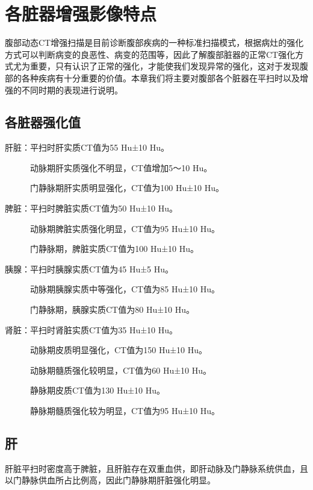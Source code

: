 \chapter{各脏器增强影像特点}

腹部动态CT增强扫描是目前诊断腹部疾病的一种标准扫描模式，根据病灶的强化方式可以判断病变的良恶性、病变的范围等，因此了解腹部脏器的正常CT强化方式尤为重要，只有认识了正常的强化，才能使我们发现异常的强化，这对于发现腹部的各种疾病有十分重要的价值。本章我们将主要对腹部各个脏器在平扫时以及增强的不同时期的表现进行说明。

\section{各脏器强化值}

肝脏：平扫时肝实质CT值为55 Hu±10 Hu。

　　　动脉期肝实质强化不明显，CT值增加5～10 Hu。

　　　门静脉期肝实质明显强化，CT值为100 Hu±10 Hu。

脾脏：平扫时脾脏实质CT值为50 Hu±10 Hu。

　　　动脉期脾脏实质强化明显，CT值为95 Hu±10 Hu。

　　　门静脉期，脾脏实质CT值为100 Hu±10 Hu。

胰腺：平扫时胰腺实质CT值为45 Hu±5 Hu。

　　　动脉期胰腺实质中等强化，CT值为85 Hu±10 Hu。

　　　门静脉期，胰腺实质CT值为80 Hu±10 Hu。

肾脏：平扫时肾脏实质CT值为35 Hu±10 Hu。

　　　动脉期皮质明显强化，CT值为150 Hu±10 Hu。

　　　动脉期髓质强化较明显，CT值为60 Hu±10 Hu。

　　　静脉期皮质CT值为130 Hu±10 Hu。

　　　静脉期髓质强化较为明显，CT值为95 Hu±10 Hu。

\section{肝}

肝脏平扫时密度高于脾脏，且肝脏存在双重血供，即肝动脉及门静脉系统供血，且以门静脉供血所占比例高，因此门静脉期肝脏强化明显。

